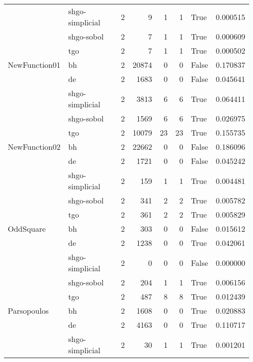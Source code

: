 \begin{longtable}{llrrrrlr}
         & shgo-simplicial &     2 &        9 &      1 &       1 &    True &    0.000515 \\
         & shgo-sobol &     2 &        7 &      1 &       1 &    True &    0.000609 \\
         & tgo &     2 &        7 &      1 &       1 &    True &    0.000502 \\
NewFunction01 & bh &     2 &    20874 &      0 &       0 &   False &    0.170837 \\
         & de &     2 &     1683 &      0 &       0 &   False &    0.045641 \\
         & shgo-simplicial &     2 &     3813 &      6 &       6 &    True &    0.064411 \\
         & shgo-sobol &     2 &     1569 &      6 &       6 &    True &    0.026975 \\
         & tgo &     2 &    10079 &     23 &      23 &    True &    0.155735 \\
NewFunction02 & bh &     2 &    22662 &      0 &       0 &   False &    0.186096 \\
         & de &     2 &     1721 &      0 &       0 &   False &    0.045242 \\
         & shgo-simplicial &     2 &      159 &      1 &       1 &    True &    0.004481 \\
         & shgo-sobol &     2 &      341 &      2 &       2 &    True &    0.005782 \\
         & tgo &     2 &      361 &      2 &       2 &    True &    0.005829 \\
OddSquare & bh &     2 &      303 &      0 &       0 &   False &    0.015612 \\
         & de &     2 &     1238 &      0 &       0 &    True &    0.042061 \\
         & shgo-simplicial &     2 &        0 &      0 &       0 &   False &    0.000000 \\
         & shgo-sobol &     2 &      204 &      1 &       1 &    True &    0.006156 \\
         & tgo &     2 &      487 &      8 &       8 &    True &    0.012439 \\
Parsopoulos & bh &     2 &     1608 &      0 &       0 &    True &    0.020883 \\
         & de &     2 &     4163 &      0 &       0 &    True &    0.110717 \\
         & shgo-simplicial &     2 &       30 &      1 &       1 &    True &    0.001201 \\

\end{longtable}
